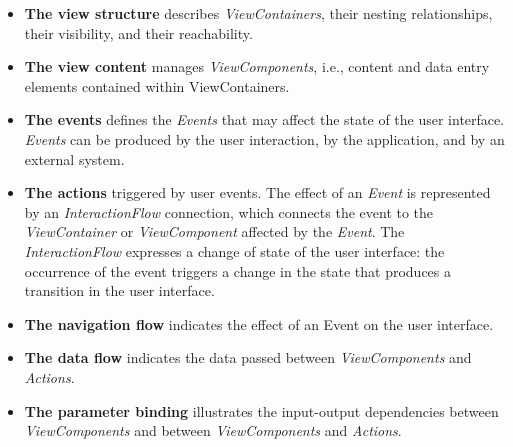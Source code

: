 \begin{itemize}
  \item \textbf{The view structure} describes \textit{ViewContainers}, their nesting relationships, their visibility, and their reachability.
    
  \item \textbf{The view content} manages \textit{ViewComponents}, i.e., content and data entry elements contained within ViewContainers.
  
  \item \textbf{The events} defines the \textit{Events} that may affect the state of the user interface. \textit{Events} can be produced by the user interaction, by the application, and by an external system.

  \item \textbf{The actions} triggered by user events. The effect of an \textit{Event} is represented by an \textit{InteractionFlow} connection, which connects the event to the \textit{ViewContainer} or \textit{ViewComponent} affected by the \textit{Event}. The \textit{InteractionFlow} expresses a change of state of the user interface: the occurrence of the event triggers a change in the state that produces a transition in the user interface.
  
  \item \textbf{The navigation flow} indicates the effect of an Event on the user interface.

  \item \textbf{The data flow} indicates the data passed between \textit{ViewComponents} and \textit{Actions}.
  
  \item \textbf{The parameter binding} illustrates the input-output dependencies between \textit{ViewComponents} and between \textit{ViewComponents} and \textit{Actions}. 


\end{itemize} 

